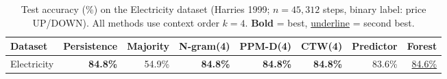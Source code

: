 \begin{table}[h]
\centering
\caption{Test accuracy (\%) on the Electricity dataset (Harries 1999; $n=45,312$ steps, binary label: price UP/DOWN). All methods use context order $k=4$. \textbf{Bold} = best, \underline{underline} = second best.}
\label{tab:electricity_accuracy}
\begin{tabular}{lrrrrrrr}
\toprule
Dataset & Persistence & Majority & N-gram(4) & PPM-D(4) & CTW(4) & Predictor & Forest \\
\midrule
Electricity & \textbf{84.8\%} & 54.9\% & \textbf{84.8\%} & \textbf{84.8\%} & \textbf{84.8\%} & 83.6\% & \underline{84.6\%} \\
\bottomrule
\end{tabular}
\end{table}

